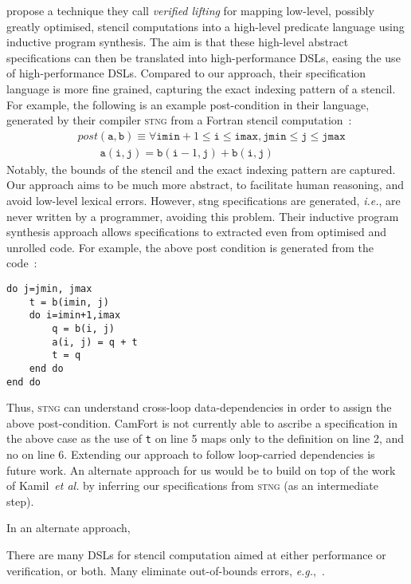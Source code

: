 \documentclass[9pt]{sigplanconf}
\theoremstyle{definition}
\newcommand{\ie}{\emph{i.e.}}
\newcommand{\eg}{\emph{e.g.}}
\begin{document}
\citet{kamil2016verified} propose a technique they call
\emph{verified lifting} for mapping low-level, possibly
greatly optimised, stencil computations into a high-level
predicate language using inductive program synthesis.
The aim is that these high-level abstract specifications can
then be translated into high-performance DSLs, easing the
use of high-performance DSLs. Compared to our approach,
their specification language is more fine grained, capturing
the exact indexing pattern of a stencil. For example, the following
is an example post-condition in their language, generated by their
compiler \textsc{stng} from a Fortran stencil computation~\cite [p.3]{kamil2016verified}:
%
\begin{align*}
& \textit{post}(\texttt{a}, \texttt{b}) \equiv \forall \texttt{imin}+1
\leq \texttt{i} \leq \texttt{imax}, \texttt{jmin} \leq \texttt{j} \leq
\texttt{jmax} \\
& \qquad \texttt{a}(\texttt{i},\texttt{j}) =
\texttt{b}(\texttt{i}-1,\texttt{j}) + \texttt{b}(\texttt{i},\texttt{j})
\end{align*}
%
Notably, the bounds of the stencil and the exact indexing pattern
are captured. Our approach aims to be much more abstract, to
facilitate human reasoning, and avoid low-level lexical
errors. However, \textsf{stng} specifications are generated, \ie{},
are never written by a programmer, avoiding this
problem. Their inductive program synthesis approach allows
specifications to extracted even from optimised and unrolled code. For
example, the above post condition is generated from the code~\cite [p.3]{kamil2016verified}:
%
\begin{verbatim}
do j=jmin, jmax
    t = b(imin, j)
    do i=imin+1,imax
        q = b(i, j)
        a(i, j) = q + t
        t = q
    end do
end do
\end{verbatim}
%
Thus, \textsc{stng} can understand cross-loop data-dependencies
in order to assign the above post-condition. CamFort is not currently
able to ascribe a specification in the above case as the use of
\texttt{t} on line 5 maps only to the definition on line 2, and no on
line 6. Extending our approach to follow loop-carried dependencies is
future work. An alternate approach for us would be to build on top of
the work of Kamil~\emph{et al.} by inferring our specifications from
\textsc{stng} (as an intermediate step).

In an alternate approach,~\citet{abe2013model}

There are many DSLs for stencil computation aimed at either
performance or verification, or both. Many eliminate out-of-bounds
errors, \eg{},~\citet{DBLP:journals/corr/abs-1109-0777}.





\onecolumn
\appendix


\end{document}
